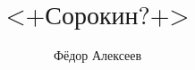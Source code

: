 



\title{$\mbox{<+Сорокин?+>}$}
\author{Фёдор Алексеев}
\raigorname{<++>}

\maketitle
\gitlink{}
\tableofcontents\newpage{}



